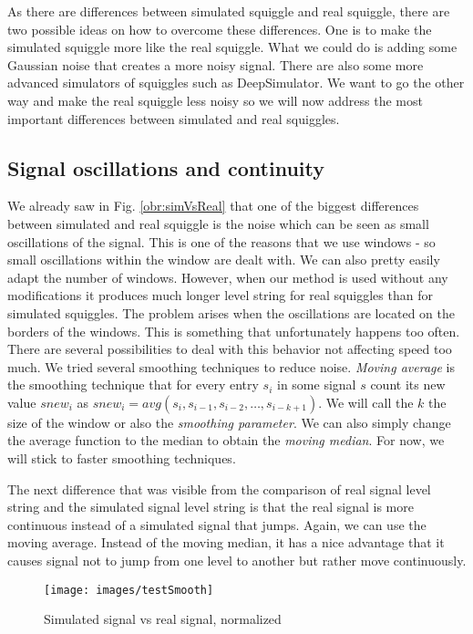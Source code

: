 As there are differences between simulated squiggle and real squiggle, there are two possible
ideas on how to overcome these differences. One is to make the simulated squiggle more like
the real squiggle. What we could do is adding some Gaussian noise that creates a
more noisy signal. There are also some more advanced simulators of squiggles such as
DeepSimulator\cite{deepsimulator}. We want to go the other way and make the real squiggle
less noisy so we will now address the most important differences between simulated and real squiggles.

\subsection{Signal oscillations and continuity}

We already saw in Fig. \ref{obr:simVsReal} that one of the biggest differences between simulated and
real squiggle is the noise which can be seen as small oscillations of the signal. This is
one of the reasons that we use windows - so small oscillations within the window
are dealt with. We can also pretty easily adapt the number of windows.
However, when our method is used without any modifications it
produces much longer level string for real squiggles than for simulated squiggles.
The problem arises when the oscillations are located on the borders of the windows.
This is something that unfortunately happens too often. There are several
possibilities to deal with this behavior not affecting speed too
much. We tried several smoothing techniques to reduce noise. \textit{Moving average} is the
smoothing technique that for every entry $s_i$ in some signal $s$ count its new value
$snew_i$ as $snew_i = avg(s_{i}, s_{i-1}, s_{i-2}, \dots , s_{i-k+1})$. We will call the
$k$ the size of the window or also the \textit{smoothing parameter}. We can also simply change
the average function to the median to obtain the \textit{moving median}. For now, we will stick
to faster smoothing techniques.

The next difference that was visible from the comparison of real signal level string
and the simulated signal level string is that the real signal is more continuous instead
of a simulated signal that jumps. Again, we can use the moving average. Instead of
the moving median, it has a nice advantage that it causes signal not to jump from
one level to another but rather move continuously.

\begin{figure}
\centerline{\texttt{[image: images/testSmooth]}}
\caption[Hehe]{Simulated signal vs real signal, normalized}
\label{obr:testSmooth}
\end{figure}


